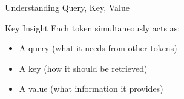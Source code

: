 \documentclass[aspectratio=169]{beamer}
\begin{document}
\begin{frame}[shrink=10]{Understanding Query, Key, Value 🔑}
\vspace{1em}

\begin{block}{Key Insight}
Each token simultaneously acts as:
\begin{itemize}\setlength{\itemsep}{0pt}
    \item A query (what it needs from other tokens)
    \item A key (how it should be retrieved)
    \item A value (what information it provides)
\end{itemize}
\end{block}
\end{frame}

\end{document}

